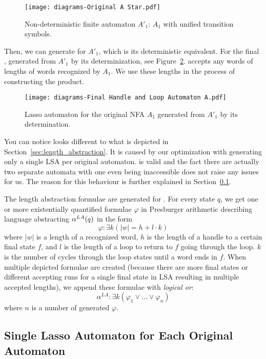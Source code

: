 \begin{figure}[ht]
	\centering
	\texttt{[image: diagrams-Original A Star.pdf]}
	\caption{Non-deterministic finite automaton $A'_1$: $A_1$ with unified transition symbols.}
	\label{fig:NFA_A1_star}
\end{figure}

Then, we can generate  for $A'_1$, which is its deterministic equivalent. For the final , generated from $A'_1$ by its determinization, see Figure~\ref{fig:HaL_A1}.  accepts any words of lengths of words recognized by $A_1$. We use these lengths in the process of constructing the product.

\begin{figure}[ht]
	\centering
	\texttt{[image: diagrams-Final Handle and Loop Automaton A.pdf]}
	\caption{Lasso automaton  for the original NFA $A_1$ generated from $A'_1$ by its determination.}
	\label{fig:HaL_A1}
\end{figure}

You can notice  looks different to what is depicted in Section~\ref{sec:length_abstraction}. It is caused by our optimization with generating only a single LSA per original automaton.  is valid and the fact there are actually two separate automata with one even being inaccessible does not raise any issues for us. The reason for this behaviour is further explained in Section~\ref{sec:singleHaL}.

The length abstraction formulae are generated for . For every state $q$, we get one or more existentially quantified formulae $\varphi$ in Presburger arithmetic describing language abstracting $\alpha^{LA}(q)$ in the form
\[
    \varphi: \exists k ( |w| = h + l \cdot k )
\]
where $|w|$ is a length of a recognized word, $h$ is the length of a handle to a certain final state $f$, and $l$ is the length of a loop to return to $f$ going through the loop. $k$ is the number of cycles through the loop states until a word ends in $f$. When multiple depicted formulae are created (because there are more final states or different accepting runs for a single final state in LSA resulting in multiple accepted lengths), we append these formulae with \emph{logical or}:
\[
    \alpha^{LA} : \exists k ( \varphi_1 \lor \ldots \lor \varphi_n )
\]
where $n$ is a number of generated $\varphi$.

\subsection{Single Lasso Automaton for Each Original Automaton}\label{sec:singleHaL}

